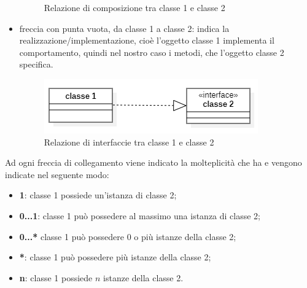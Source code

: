\begin{itemize}
\begin{figure}[H]
		\caption{Relazione di composizione tra classe 1 e classe 2}
	\end{figure}
	\item freccia con punta vuota, da classe 1 a classe 2: indica la realizzazione/implementazione, cioè l'oggetto classe 1 implementa il comportamento, quindi nel nostro caso i metodi, che l'oggetto classe 2 specifica. 
	\begin{figure}[H]
		\centering\includegraphics{../immagini/normeUML/frecInter.png}
		\caption{Relazione di interfaccie tra classe 1 e classe 2}
	\end{figure}
\end{itemize}
Ad ogni freccia di collegamento viene indicato la molteplicità che ha e vengono indicate nel seguente modo:
\begin{itemize}
	\item \textbf{1}: classe 1 possiede un'istanza di classe 2;
	\item \textbf{0...1}: classe 1 può possedere al massimo una istanza di classe 2;
	\item \textbf{0...*} classe 1 può possedere 0 o più istanze della classe 2;
	\item \textbf{*}: classe 1 può possedere più istanze della classe 2;
	\item \textbf{n}: classe 1 possiede $n$ istanze della classe 2.
\end{itemize}
